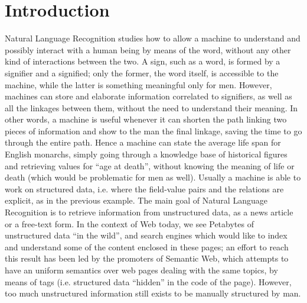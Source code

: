 \documentclass[a4paper,11pt]{report}
\begin{document}
\chapter{Introduction}
\label{sec:intro}
Natural Language Recognition studies how to allow a machine to understand and possibly interact with a human being by means of the word, without any other kind of interactions between the two. A sign, such as a word, is formed by a signifier and a signified; only the former, the word itself, is accessible to the machine, while the latter is something meaningful only for men. However, machines can store and elaborate information correlated to signifiers, as well as all the linkages between them, without the need to understand their meaning. In other words, a machine is useful whenever it can shorten the path linking two pieces of information and show to the man the final linkage, saving the time to go through the entire path. Hence a machine can state the average life span for English monarchs, simply going through a knowledge base of historical figures and retrieving values for ``age at death'', without knowing the meaning of life or death (which would be problematic for men as well).
Usually a machine is able to work on structured data, i.e. where the field-value pairs and the relations are explicit, as in the previous example. The main goal of Natural Language Recognition is to retrieve information from unstructured data, as a news article or a free-text form. In the context of Web today, we see Petabytes of unstructured data ``in the wild'', and search engines which would like to index and understand some of the content enclosed in these pages; an effort to reach this result has been led by the promoters of Semantic Web, which attempts to have an uniform semantics over web pages dealing with the same topics, by means of tags (i.e. structured data ``hidden'' in the code of the page). However, too much unstructured information still exists to be manually structured by man.
\end{document}
